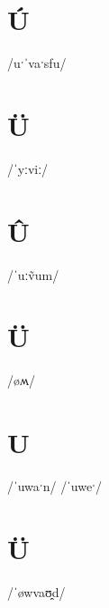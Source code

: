 \documentclass[10pt,a4paper,twoside]{book}
\begin{document}
\section*{Ú}

\begin{multicols}{3}
 {/uˑˈvaˑsfu/} {}
\end{multicols}

\section*{Ü}

\begin{multicols}{3}
 {/ˈyːviː/} {}
\end{multicols}

\section*{Û}

\begin{multicols}{3}
 {/ˈuːṽum/} {}
\end{multicols}

\section*{Ü}

\begin{multicols}{3}
 {/øʍ/} {}
\end{multicols}

\section*{U}

\begin{multicols}{3}
 {/ˈuwaˑn/} {}
 {/ˈuweˑ/} {}
\end{multicols}

\section*{Ü}

\begin{multicols}{3}
 {/ˈøwvaʊ̯d/} {}
\end{multicols}
\end{document}
